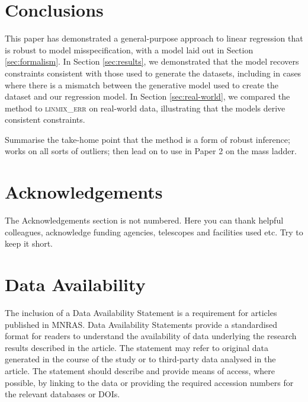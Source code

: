 \documentclass[fleqn,usenatbib]{mnras}
\begin{document}


\section{Conclusions}

This paper has demonstrated a general-purpose approach to linear regression that
is robust to model misspecification, with a model laid out in Section
\ref{sec:formalism}. In Section \ref{sec:results}, we demonstrated that the
model recovers constraints consistent with those used to generate the datasets,
including in cases where there is a mismatch between the generative model used
to create the dataset and our regression model. In Section \ref{sec:real-world},
we compared the method to \textsc{linmix\_err} \citep{Kelly:2007} on real-world
data, illustrating that the models derive consistent constraints.

Summarise the take-home point that the method is a form of robust inference;
works on all sorts of outliers; then lead on to use in Paper 2 on the mass
ladder.

\section*{Acknowledgements}

The Acknowledgements section is not numbered. Here you can thank helpful
colleagues, acknowledge funding agencies, telescopes and facilities used etc.
Try to keep it short.

\section*{Data Availability}


The inclusion of a Data Availability Statement is a requirement for articles
published in MNRAS. Data Availability Statements provide a standardised format
for readers to understand the availability of data underlying the research
results described in the article. The statement may refer to original data
generated in the course of the study or to third-party data analysed in the
article. The statement should describe and provide means of access, where
possible, by linking to the data or providing the required accession numbers for
the relevant databases or DOIs.
\end{document}
